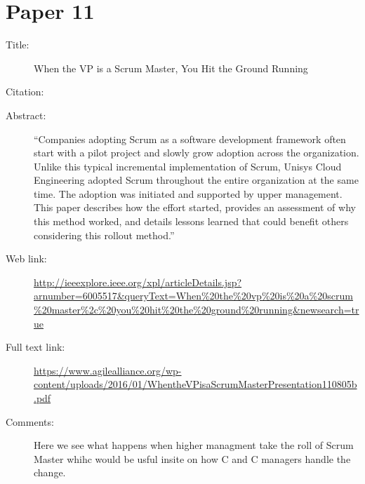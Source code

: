 \documentclass{scrartcl}
\begin{document}
\section*{Paper 11}
\begin{description}
	\item[Title:] When the VP is a Scrum Master, You Hit the Ground Running 
	\item[Citation:] \cite{VPMaster}
	\item[Abstract:] ``Companies adopting Scrum as a software development framework often start with a pilot project and slowly grow adoption across the organization. Unlike this typical incremental implementation of Scrum, Unisys Cloud Engineering adopted Scrum throughout the entire organization at the same time. The adoption was initiated and supported by upper management. This paper describes how the effort started, provides an assessment of why this method worked, and details lessons learned that could benefit others considering this rollout method.''
	\item[Web link:] \url{http://ieeexplore.ieee.org/xpl/articleDetails.jsp?arnumber=6005517&queryText=When%20the%20vp%20is%20a%20scrum%20master%2c%20you%20hit%20the%20ground%20running&newsearch=true}
	\item[Full text link:] \url{https://www.agilealliance.org/wp-content/uploads/2016/01/WhentheVPisaScrumMasterPresentation110805b.pdf}
	\item[Comments:] Here we see what happens when higher managment take the roll of Scrum Master whihc would be usful insite on how C and C managers handle the change.
\end{description}
\end{document}

